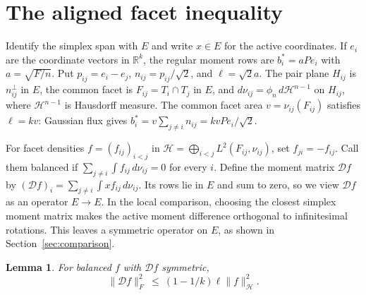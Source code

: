 \documentclass[11pt,reqno]{amsart}
\newtheorem{lemma}[theorem]{Lemma}
\newcommand{\R}{\mathbb R}
\newcommand{\norm}[1]{\lVert #1\rVert}
\newcommand{\HH}{\mathcal H}
\newcommand{\DD}{\mathcal D}
\begin{document}
\section{The aligned facet inequality}\label{sec:interface}

Identify the simplex span with $E$ and write $x\in E$ for the active
coordinates. If $e_i$ are the coordinate vectors in $\R^k$, the regular
moment rows are $b_i^*=aPe_i$ with $a=\sqrt{F/n}$. Put
$p_{ij}=e_i-e_j$, $n_{ij}=p_{ij}/\sqrt2$, and $\ell=\sqrt2a$. The pair
plane $H_{ij}$ is $n_{ij}^{\perp}$ in $E$, the common facet is
$F_{ij}=T_i\cap T_j$ in $E$, and $d\nu_{ij}=\phi_n\,d\mathcal H^{n-1}$ on
$H_{ij}$, where $\mathcal H^{n-1}$ is Hausdorff measure. The common facet
area $v=\nu_{ij}(F_{ij})$ satisfies $\ell=kv$: Gaussian flux gives
$b_i^*=v\sum_{j\ne i}n_{ij}=kvPe_i/\sqrt2$.

For facet densities $f=(f_{ij})_{i<j}$ in
$\HH=\bigoplus_{i<j}L^2(F_{ij},\nu_{ij})$, set $f_{ji}=-f_{ij}$.
Call them balanced if $\sum_{j\ne i}\int f_{ij}\,d\nu_{ij}=0$ for
every $i$. Define the moment matrix $\DD f$ by
$(\DD f)_i=\sum_{j\ne i}\int x f_{ij}\,d\nu_{ij}$. Its rows lie in
$E$ and sum to zero, so we view $\DD f$ as an operator $E\to E$.
In the local comparison, choosing the closest simplex moment matrix
makes the active moment difference orthogonal to infinitesimal rotations.
This leaves a symmetric operator on $E$, as shown in
Section~\ref{sec:comparison}.

\begin{lemma}\label{lem:interface}
For balanced $f$ with $\DD f$ symmetric,
\[
 \norm{\DD f}_F^2\ \le\ (1-1/k)\ell\norm f_\HH^2.
\]
\end{lemma}
\end{document}
